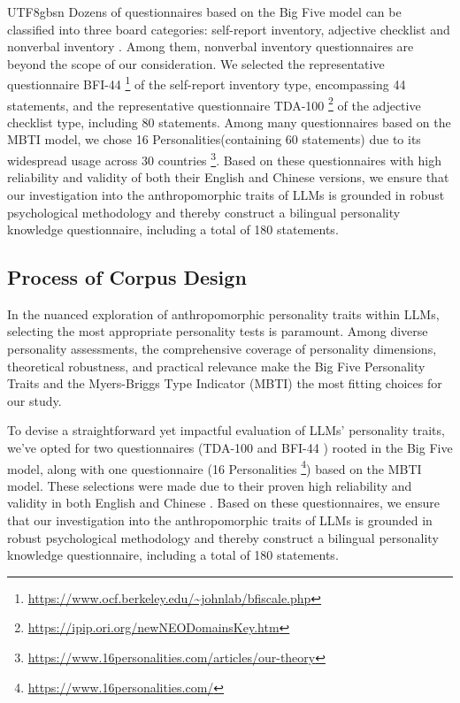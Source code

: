 \documentclass{article}
\theoremstyle{plain}
\theoremstyle{definition}
\theoremstyle{remark}
\begin{document}
\begin{CJK*}{UTF8}{gbsn}
Dozens of questionnaires based on the Big Five model can be classified into three board categories: self-report inventory, adjective checklist and nonverbal inventory \citep{chen2015evolution}. Among them, nonverbal inventory questionnaires are beyond the scope of our consideration. We selected the representative questionnaire BFI-44 \footnote{\url{https://www.ocf.berkeley.edu/~johnlab/bfiscale.php}} of the self-report inventory type, encompassing 44 statements, and the representative questionnaire TDA-100 \footnote{\url{https://ipip.ori.org/newNEODomainsKey.htm}} of the adjective checklist type, including 80 statements. Among many questionnaires based on the MBTI model, we chose 16 Personalities(containing 60 statements) due to its widespread usage across 30 countries \footnote{\url{https://www.16personalities.com/articles/our-theory}}. Based on these questionnaires with high reliability and validity of both their English and Chinese versions, we ensure that our investigation into the anthropomorphic traits of LLMs is grounded in robust psychological methodology and thereby construct a bilingual personality knowledge questionnaire, including a total of 180 statements.

\subsection{Process of Corpus Design}
\fi

In the nuanced exploration of anthropomorphic personality traits within LLMs, selecting the most appropriate personality tests is paramount. Among diverse personality assessments, the comprehensive coverage of personality dimensions, theoretical robustness, and practical relevance make the Big Five Personality Traits \citep{goldberg1981language, costa2008revised} and the Myers-Briggs Type Indicator (MBTI) \citep{myers1962myers} the most fitting choices for our study. 

To devise a straightforward yet impactful evaluation of LLMs' personality traits, we've opted for two questionnaires (TDA-100 \citep{goldberg1992development} and BFI-44 \citep{john1991big}) rooted in the Big Five model, along with one questionnaire (16 Personalities \footnote{\url{https://www.16personalities.com/}}) based on the MBTI model. These selections were made due to their proven high reliability and validity in both English and Chinese \citep{goldberg1992development, john1991big, makwana2020confirmatory, zhang2012BFC}. Based on these questionnaires, we ensure that our investigation into the anthropomorphic traits of LLMs is grounded in robust psychological methodology and thereby construct a bilingual personality knowledge questionnaire, including a total of 180 statements.


\end{CJK*}
\end{document}
